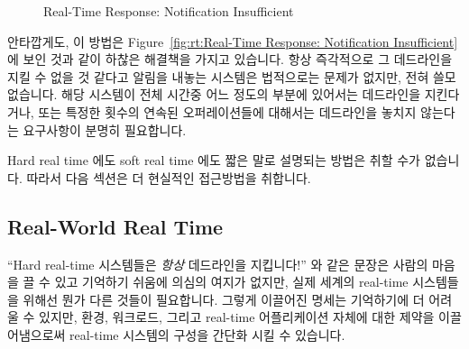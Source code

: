 \begin{figure}[bt]
\centering
{}
\caption{Real-Time Response: Notification Insufficient}
\end{figure}

안타깝게도, 이 방법은
Figure~\ref{fig:rt:Real-Time Response: Notification Insufficient} 에 보인 것과
같이 하찮은 해결책을 가지고 있습니다.
항상 즉각적으로 그 데드라인을 지킬 수 없을 것 같다고 알림을 내놓는 시스템은
법적으로는 문제가 없지만, 전혀 쓸모없습니다.
해당 시스템이 전체 시간중 어느 정도의 부분에 있어서는 데드라인을 지킨다거나,
또는 특정한 횟수의 연속된 오퍼레이션들에 대해서는 데드라인을 놓치지 않는다는
요구사항이 분명히 필요합니다.

Hard real time 에도 soft real time 에도 짧은 말로 설명되는 방법은 취할 수가
없습니다.
따라서 다음 섹션은 더 현실적인 접근방법을 취합니다.

\subsection{Real-World Real Time}
\label{sec:rt:Real-World Real Time}

``Hard real-time 시스템들은 \emph{항상} 데드라인을 지킵니다!'' 와 같은 문장은
사람의 마음을 끌 수 있고 기억하기 쉬움에 의심의 여지가 없지만, 실제 세계의
real-time 시스템들을 위해선 뭔가 다른 것들이 필요합니다.
그렇게 이끌어진 명세는 기억하기에 더 어려울 수 있지만, 환경, 워크로드, 그리고
real-time 어플리케이션 자체에 대한 제약을 이끌어냄으로써 real-time 시스템의
구성을 간단화 시킬 수 있습니다.

